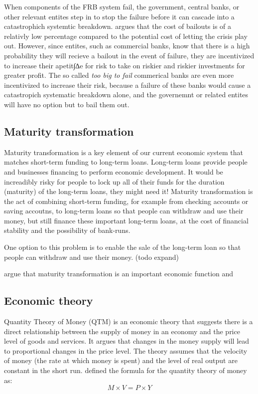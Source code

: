 When components of the FRB system fail, the government, central banks, or other relevant entites step in to stop the failure before it can cascade into a catastrophich systemtic breakdown. \textcite{berger2020tarp} argues that the cost of bailouts is of a relativly low percentage compared to the potential cost of letting the crisis play out. However, since entites, such as commercial banks, know that there is a high probability they will recieve a bailout in the event of failure, they are incentivized to increase their apetit∫∆e for risk to take on riskier and riskier investments for greater profit. The so called \textit{too big to fail} commerical banks are even more incentivized to increase their risk, because a failure of these banks would cause a catastropich systematic breakdown alone, and the governemnt or related entites will have no option but to bail them out.

\subsection{Maturity transformation}
Maturity transformation is a key element of our current economic system that matches short-term funding to long-term loans. Long-term loans provide people and businesses financing to perform economic development. It would be increadibly risky for people to lock up all of their funds for the duration (maturity) of the long-term loans, they might need it! Maturity transformation is the act of combining short-term funding, for example from checking accounts or saving accoutns, to long-term loans so that people can withdraw and use their money, but still finance these important long-term loans, at the cost of financial stability and the possibility of bank-runs. 

One option to this problem is to enable the sale of the long-term loan so that people can withdraw and use their money. (todo expand)


\textcite{Stellinga2021} argue that maturity transformation is an important economic function and 

\subsection{Economic theory}
Quantity Theory of Money (QTM) is an economic theory that suggests there is a direct relationship between the supply of money in an economy and the price level of goods and services. It argues that changes in the money supply will lead to proportional changes in the price level. The theory assumes that the velocity of money (the rate at which money is spent) and the level of real output are constant in the short run. \textcite{fisherQTM} defined the formula for the quantity theory of money as:
\begin{equation}
    M \times V = P \times Y
\end{equation}

